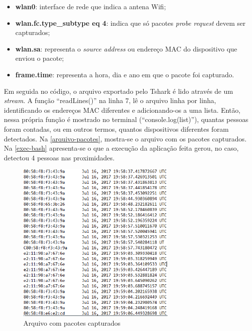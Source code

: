 \begin{itemize}
  \item \textbf{wlan0}: interface de rede que indica a antena Wifi;
  \item \textbf{wlan.fc.type\_subtype eq 4}: indica que só pacotes \emph{probe request} devem ser capturados;
  \item \textbf{wlan.sa}: representa o \emph{source address} ou endereço MAC do dispositivo que enviou o pacote;
  \item \textbf{frame.time}: representa a hora, dia e ano em que o pacote foi capturado.
\end{itemize}

Em seguida no código, o arquivo exportado pelo Tshark é lido através de um \emph{stream}. A função ``readLines()''
na linha 7, lê o arquivo linha por linha, identificando os endereços MAC diferentes e adicionando-os a uma lista.
Então, nessa própria função é mostrado no terminal (``console.log(list)''), quantas pessoas foram contadas, ou em outros termos,
quantos dispositivos diferentes foram detectados. Na \autoref{arquivo-pacotes}, mostra-se o arquivo com os pacotes
capturados. Na \autoref{exec-bash} apresenta-se o que a execução da aplicação feita gerou, no caso, detectou
4 pessoas nas proximidades.

\begin{figure}[!h]
  \caption{\label{arquivo-pacotes}Arquivo com pacotes capturados}
  \begin{center}
    \includegraphics[width=0.70\textwidth]{img/packets.png}
  \end{center}
\end{figure}

